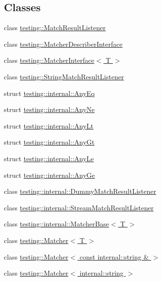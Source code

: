 \subsection*{Classes}
\begin{DoxyCompactItemize}
\item 
class \hyperlink{classtesting_1_1_match_result_listener}{testing\+::\+Match\+Result\+Listener}
\item 
class \hyperlink{classtesting_1_1_matcher_describer_interface}{testing\+::\+Matcher\+Describer\+Interface}
\item 
class \hyperlink{classtesting_1_1_matcher_interface}{testing\+::\+Matcher\+Interface$<$ T $>$}
\item 
class \hyperlink{classtesting_1_1_string_match_result_listener}{testing\+::\+String\+Match\+Result\+Listener}
\item 
struct \hyperlink{structtesting_1_1internal_1_1_any_eq}{testing\+::internal\+::\+Any\+Eq}
\item 
struct \hyperlink{structtesting_1_1internal_1_1_any_ne}{testing\+::internal\+::\+Any\+Ne}
\item 
struct \hyperlink{structtesting_1_1internal_1_1_any_lt}{testing\+::internal\+::\+Any\+Lt}
\item 
struct \hyperlink{structtesting_1_1internal_1_1_any_gt}{testing\+::internal\+::\+Any\+Gt}
\item 
struct \hyperlink{structtesting_1_1internal_1_1_any_le}{testing\+::internal\+::\+Any\+Le}
\item 
struct \hyperlink{structtesting_1_1internal_1_1_any_ge}{testing\+::internal\+::\+Any\+Ge}
\item 
class \hyperlink{classtesting_1_1internal_1_1_dummy_match_result_listener}{testing\+::internal\+::\+Dummy\+Match\+Result\+Listener}
\item 
class \hyperlink{classtesting_1_1internal_1_1_stream_match_result_listener}{testing\+::internal\+::\+Stream\+Match\+Result\+Listener}
\item 
class \hyperlink{classtesting_1_1internal_1_1_matcher_base}{testing\+::internal\+::\+Matcher\+Base$<$ T $>$}
\item 
class \hyperlink{classtesting_1_1_matcher}{testing\+::\+Matcher$<$ T $>$}
\item 
class \hyperlink{classtesting_1_1_matcher_3_01const_01internal_1_1string_01_6_01_4}{testing\+::\+Matcher$<$ const internal\+::string \& $>$}
\item 
class \hyperlink{classtesting_1_1_matcher_3_01internal_1_1string_01_4}{testing\+::\+Matcher$<$ internal\+::string $>$}

\end{DoxyCompactItemize}
